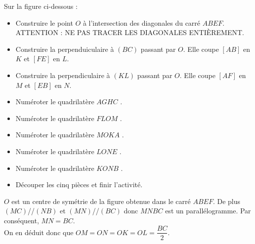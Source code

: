 \begin{activite}
    \pagebreak
    \vspace*{-15mm}
    Sur la figure ci-dessous : 
    \begin{itemize}
        \item Construire le point $O$ à l'intersection des diagonales du carré $ABEF$.\\ ATTENTION : NE PAS TRACER LES DIAGONALES ENTIÈREMENT.
        \item Construire la perpenduiculaire à $(BC)$ passant par $O$. Elle coupe $[AB]$ en $K$ et $[FE]$ en $L$.
        \item Construire la perpendiculaire à $(KL)$ passant par $O$. Elle coupe $[AF]$ en $M$ et $[EB]$ en $N$.
        \item Numéroter le quadrilatère $AGHC$ .
        \item Numéroter le quadrilatère $FLOM$ .
        \item Numéroter le quadrilatère $MOKA$ .
        \item Numéroter le quadrilatère $LONE$ .
        \item Numéroter le quadrilatère $KONB$ .
        \item Découper les cinq pièces et finir l'activité.
    \end{itemize}
    
    \begin{remarque}
        $O$ est un centre de symétrie de la figure obtenue dans le carré $ABEF$. De plus $(MC)$//$(NB)$ et $(MN)$//$(BC)$ donc $MNBC$ est un parallélogramme. 
        Par conséquent, $MN=BC$.\\ On en déduit donc que $OM=ON=OK=OL=\dfrac{BC}{2}$.
    \end{remarque}
\end{activite}